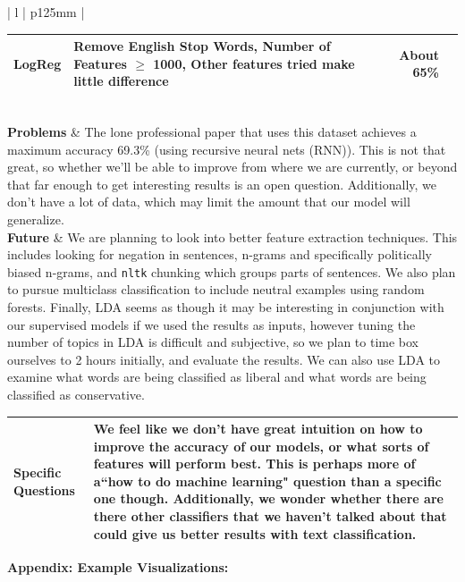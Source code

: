 \documentclass[11pt]{article}
\begin{document}
\begin{center}
\begin{tabular}{ | l | p{125mm} |  }
\begin{tabular}{|r|p{50mm}|r|r|}
    LogReg & Remove English Stop Words, Number of Features $\geq$ 1000, Other features tried make little difference & About 65\% \\ \hline
    \end{tabular}
    \\ \hline
    \textbf{Problems} &  The lone professional paper that uses this dataset achieves a maximum accuracy 69.3\% (using recursive neural nets (RNN)). This is not that great, so whether we'll be able to improve from where we are currently, or beyond that far enough to get interesting results is an open question. Additionally, we don't have a lot of data, which may limit the amount that our model will generalize.  \\ \hline
    \textbf{Future} & We are planning to look into better feature extraction techniques. This includes looking for negation in sentences, n-grams and specifically politically biased n-grams, and \texttt{nltk} chunking which groups parts of sentences. We also plan to pursue multiclass classification to include neutral examples using random forests. Finally, LDA seems as though it may be interesting in conjunction with our supervised models if we used the results as inputs, however tuning the number of topics in LDA is difficult and subjective, so we plan to time box ourselves to 2 hours initially, and evaluate the results. We can also use LDA to examine what words are being classified as liberal and what words are being classified as conservative. \\ \hline
  \end{tabular}
\end{center}

\begin{center}
  \begin{tabular}{ | l | p{125mm} |  }
    \hline
    \textbf{Specific Questions} & We feel like we don't have great intuition on how to improve the accuracy of our models, or what sorts of features will perform best. This is perhaps more of a``how to do machine learning" question than a specific one though. Additionally, we wonder whether there are there other classifiers that we haven't talked about that could give us better results with text classification. \\ \hline
  \end{tabular}
\end{center}

\textbf{Appendix: Example Visualizations:}
\end{document}
